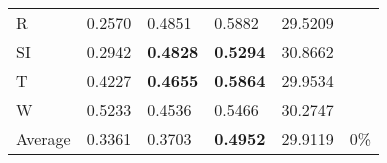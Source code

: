 \documentclass[11pt, a4paper]{article}
\begin{document}
\begin{table}[H]
\begin{tabular}{llllll}
R                                & 0.2570                            & 0.4851                            & 0.5882                               & 29.5209                                     &                                   \\
SI                        & 0.2942                            & \textbf{0.4828}                   & \textbf{0.5294}                      & 30.8662                                     &                                   \\
T                              & 0.4227                            & \textbf{0.4655}                   & \textbf{0.5864}                      & 29.9534                                     &                                   \\
W                             & 0.5233                            & 0.4536                            & 0.5466                               & 30.2747                                     &                                   \\ \hline
Average                               & 0.3361                            & 0.3703                            & \textbf{0.4952}                      & 29.9119                                     & 0\%
\end{tabular}
\end{table}
\end{document}
